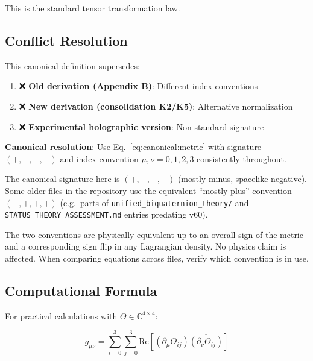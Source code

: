 This is the standard tensor transformation law.

\subsection{Conflict Resolution}

This canonical definition supersedes:

\begin{enumerate}
    \item ❌ \textbf{Old derivation (Appendix B)}: Different index conventions
    \item ❌ \textbf{New derivation (consolidation K2/K5)}: Alternative normalization
    \item ❌ \textbf{Experimental holographic version}: Non-standard signature
\end{enumerate}

\textbf{Canonical resolution}: Use Eq.~\ref{eq:canonical:metric} with signature $(+,-,-,-)$ and index convention $\mu,\nu = 0,1,2,3$ consistently throughout.

\begin{tcolorbox}[colback=blue!5!white,colframe=blue!40!black,title=Signature convention note]
The canonical signature here is $(+,-,-,-)$ (mostly minus, spacelike negative).
Some older files in the repository use the equivalent ``mostly plus'' convention
$(-,+,+,+)$ (e.g.\ parts of \texttt{unified\_biquaternion\_theory/} and
\texttt{STATUS\_THEORY\_ASSESSMENT.md} entries predating v60).

The two conventions are physically equivalent up to an overall sign of the metric
and a corresponding sign flip in any Lagrangian density.  No physics claim
is affected.  When comparing equations across files, verify which convention is in use.
\end{tcolorbox}

\subsection{Computational Formula}

For practical calculations with $\Theta \in \mathbb{C}^{4 \times 4}$:

\begin{equation}
\label{eq:canonical:metric_computational}
g_{\mu\nu} = \sum_{i=0}^{3}\sum_{j=0}^{3} \text{Re}\left[(\partial_\mu\Theta_{ij}) \overline{(\partial_\nu\Theta_{ij})}\right]
\end{equation}

